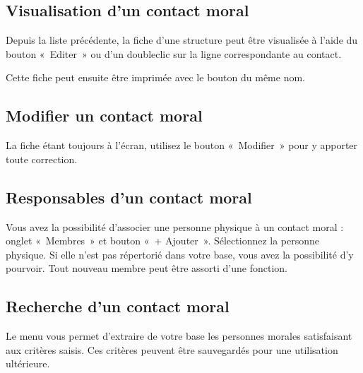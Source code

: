 \documentclass[a4paper,10pt,oneside,french]{sphinxmanual}
\begin{document}
\subsection{Visualisation d’un contact moral}
\label{\detokenize{contacts/legal_entity:visualisation-d-un-contact-moral}}
\sphinxAtStartPar
Depuis la liste précédente, la fiche d’une structure peut être visualisée à l’aide du bouton « Editer » ou d’un double\sphinxhyphen{}clic sur la ligne correspondante au contact.

\noindent{}

\sphinxAtStartPar
Cette fiche peut ensuite être imprimée avec le bouton du même nom.


\subsection{Modifier un contact moral}
\label{\detokenize{contacts/legal_entity:modifier-un-contact-moral}}
\sphinxAtStartPar
La fiche étant toujours à l’écran, utilisez le bouton « Modifier » pour y apporter toute correction.

\noindent{}


\subsection{Responsables d’un contact moral}
\label{\detokenize{contacts/legal_entity:responsables-d-un-contact-moral}}
\sphinxAtStartPar
Vous avez la possibilité d’associer une personne physique à un contact moral : onglet « Membres » et bouton « + Ajouter ».
Sélectionnez la personne physique. Si elle n’est pas répertorié dans votre base, vous avez la possibilité d’y pourvoir.
Tout nouveau membre peut être assorti d’une fonction.

\noindent{}


\subsection{Recherche d’un contact moral}
\label{\detokenize{contacts/legal_entity:recherche-d-un-contact-moral}}
\sphinxAtStartPar
Le menu  vous permet d’extraire de votre base les personnes morales satisfaisant aux critères saisis. Ces critères peuvent être sauvegardés pour une utilisation ultérieure.

\noindent{}
\end{document}
